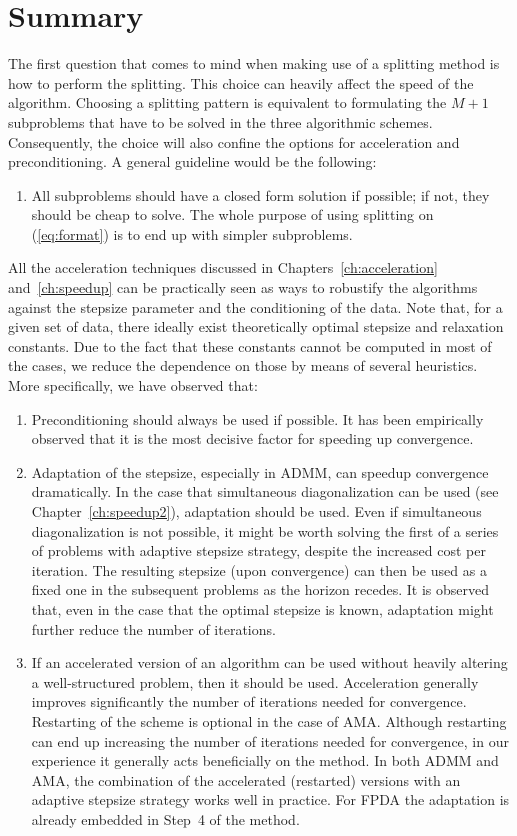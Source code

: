 \documentclass[openany]{now}
\begin{document}
\chapter{Summary}{\label{ch:splitGuideline}}
The first question that comes to mind when making use of a splitting method is how to perform the splitting. This choice can heavily affect the speed of the algorithm. Choosing a splitting pattern is equivalent to formulating the $M+1$ subproblems that have to be solved in the three algorithmic schemes. Consequently, the choice will also confine the options for acceleration and preconditioning. A general guideline would be the following:
\begin{enumerate}
\item All subproblems should have a closed form solution if possible; if not, they should be cheap to solve. The whole purpose of using splitting on (\ref{eq:format}) is to end up with simpler subproblems. 
\end{enumerate}
All the acceleration techniques discussed in Chapters~\ref{ch:acceleration} and~\ref{ch:speedup} can be practically seen as ways to robustify the algorithms against the stepsize parameter and the conditioning of the data. Note that, for a given set of data, there ideally exist theoretically optimal stepsize and relaxation constants. Due to the fact that these constants cannot be computed in most of the cases, we reduce the dependence on those by means of several heuristics. More specifically, we have observed that: 
\begin{enumerate}[resume]
\item Preconditioning should always be used if possible. It has been empirically observed that it is the most decisive factor for speeding up convergence.
\item Adaptation of the stepsize, especially in ADMM, can speedup convergence dramatically. In the case that simultaneous diagonalization can be used (see Chapter~\ref{ch:speedup2}), adaptation should be used. Even if simultaneous diagonalization is not possible, it might be worth solving the first of a series of problems with adaptive stepsize strategy, despite the increased cost per iteration. The resulting stepsize (upon convergence) can then be used as a fixed one in the subsequent problems as the horizon recedes. It is observed that, even in the case that the optimal stepsize is known, adaptation might further reduce the number of iterations. 
\item If an accelerated version of an algorithm can be used without heavily altering a well-structured problem, then it should be used. Acceleration generally improves significantly the number of iterations needed for convergence. Restarting of the scheme is optional in the case of AMA. Although restarting can end up increasing the number of iterations needed for convergence, in our experience it generally acts beneficially on the method. In both ADMM and AMA, the combination of the accelerated (restarted) versions with an adaptive stepsize strategy works well in practice. For FPDA the adaptation is already embedded in Step~4 of the method. 
\end{enumerate}
\end{document}
